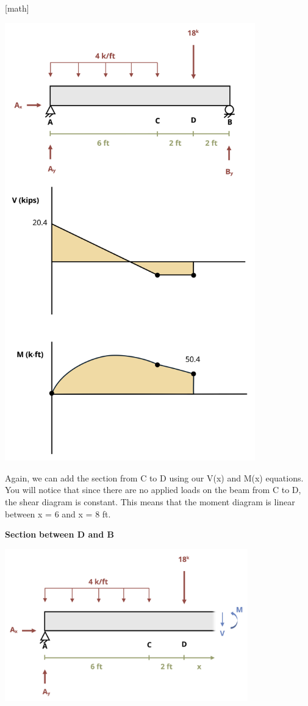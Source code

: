 \documentclass[
  letterpaper,
  DIV=11,
  numbers=noendperiod]{scrreprt}
\begin{document}
\begin{tcolorbox}
{[}math{]}

\begin{center}
\includegraphics[width=4.27083in,height=\textheight]{images/CH7 PNGs/example 7.2 part 7.png}
\end{center}

Again, we can add the section from C to D using our V(x) and M(x)
equations. You will notice that since there are no applied loads on the
beam from C to D, the shear diagram is constant. This means that the
moment diagram is linear between x = 6 and x = 8 ft.

\textbf{Section} \textbf{between D and B}

\begin{center}
\includegraphics[width=4.14583in,height=\textheight]{images/CH7 PNGs/example 7.2 part 8.png}
\end{center}


\end{tcolorbox}
\end{document}
